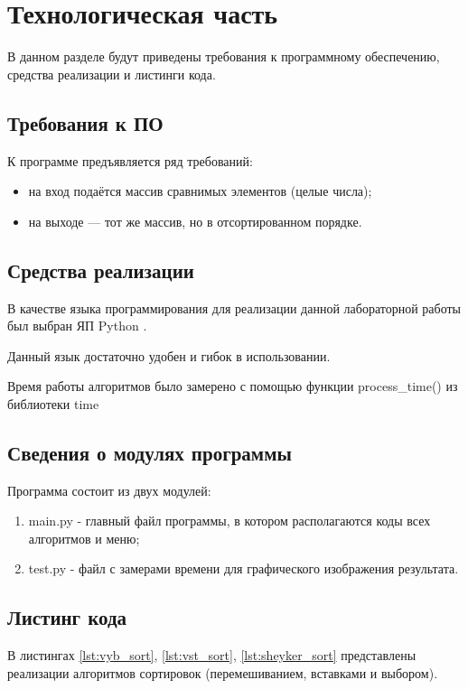 \chapter{Технологическая часть}

В данном разделе будут приведены требования к программному обеспечению, средства реализации и листинги кода.

\section{Требования к ПО}

К программе предъявляется ряд требований:
\begin{itemize}
	\item на вход подаётся массив сравнимых элементов (целые числа);
	\item на выходе — тот же массив, но в отсортированном порядке.
\end{itemize}

\section{Средства реализации}

В качестве языка программирования для реализации данной лабораторной работы был выбран ЯП Python \cite{pythonlang}. 

Данный язык достаточно удобен и гибок в использовании. 

Время работы алгоритмов было замерено с помощью функции process\_time() из библиотеки time \cite{pythonlangtime}

\section{Сведения о модулях программы}
Программа состоит из двух модулей:
\begin{enumerate}
	\item main.py - главный файл программы, в котором располагаются коды всех алгоритмов и меню;
	\item test.py - файл с замерами времени для графического изображения результата.
\end{enumerate}


\section{Листинг кода}
В листингах \ref{lst:vyb_sort}, \ref{lst:vst_sort}, \ref{lst:sheyker_sort} представлены реализации алгоритмов сортировок (перемешиванием, вставками и выбором).

